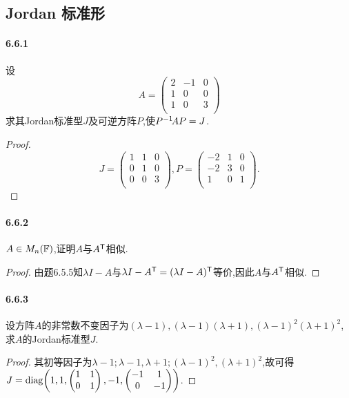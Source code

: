 \documentclass[11pt]{article}
\begin{document}
\subsection{Jordan 标准形}
\paragraph{6.6.1}设
$$A=\begin{pmatrix}
    2 & -1 & 0 \\
    1 & 0 & 0 \\
    1 & 0 & 3 \\
\end{pmatrix}$$
求其Jordan标准型$J$及可逆方阵$P$,使$P^{-1}\! AP=J$.
\begin{proof}
    $$J=\begin{pmatrix}
        1 & 1 & 0 \\
        0 & 1 & 0 \\
        0 & 0 & 3 \\
    \end{pmatrix}, P=\begin{pmatrix}
        -2 & 1 & 0 \\
        -2 & 3 & 0 \\
        1 & 0 & 1 \\
    \end{pmatrix}.$$
\end{proof}
\paragraph{6.6.2}$A\in M_n(\mathbb{F})$,证明$A$与$A^{\mathsf{T}}$相似.
\begin{proof}
    由题6.5.5知$\lambda I-A$与$\lambda I-A^{\mathsf{T}}=(\lambda I-A)^{\mathsf{T}}$等价,因此$A$与$A^{\mathsf{T}}$相似.
\end{proof}
\paragraph{6.6.3}设方阵$A$的非常数不变因子为$(\lambda-1),(\lambda-1)(\lambda+1),(\lambda-1)^2(\lambda+1)^2$,求$A$的Jordan标准型$J$.
\begin{proof}
    其初等因子为$\lambda-1;\lambda-1,\lambda+1;(\lambda-1)^2,(\lambda+1)^2$,故可得$J=\operatorname{diag}\!\left(1,1,\begin{pmatrix} 1&1\\0&1 \end{pmatrix},-1,\begin{pmatrix} -1&1\\0&-1 \end{pmatrix}\right)$.
\end{proof}
\end{document}
